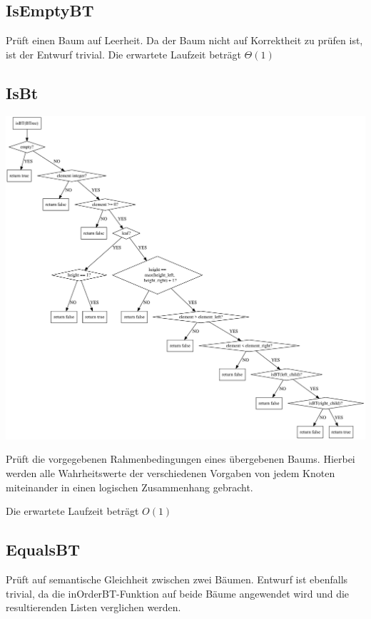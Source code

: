 \documentclass[11pt]{article}
\begin{document}
    \subsection{IsEmptyBT}\label{subsec:isemptybt}
    Prüft einen Baum auf Leerheit.
    Da der Baum nicht auf Korrektheit zu prüfen ist,
    ist der Entwurf trivial.
    Die erwartete Laufzeit beträgt
    \begin{math}
        \Theta(1)
    \end{math}

    \subsection{IsBt}\label{subsec:isbt}

    \begin{center}
        \includegraphics[width=1.2\columnwidth] {isBt}
    \end{center}

    Prüft die vorgegebenen Rahmenbedingungen eines übergebenen Baums.
    Hierbei werden alle Wahrheitswerte der verschiedenen
    Vorgaben von jedem Knoten miteinander in einen logischen
    Zusammenhang gebracht.

    Die erwartete Laufzeit beträgt
    \begin{math}
        O(1)
    \end{math}

    \subsection{EqualsBT}\label{subsec:equalsbt}
    Prüft auf semantische Gleichheit zwischen zwei Bäumen.
    Entwurf ist ebenfalls trivial, da die inOrderBT-Funktion
    auf beide Bäume angewendet wird und die resultierenden Listen verglichen werden.
\end{document}
